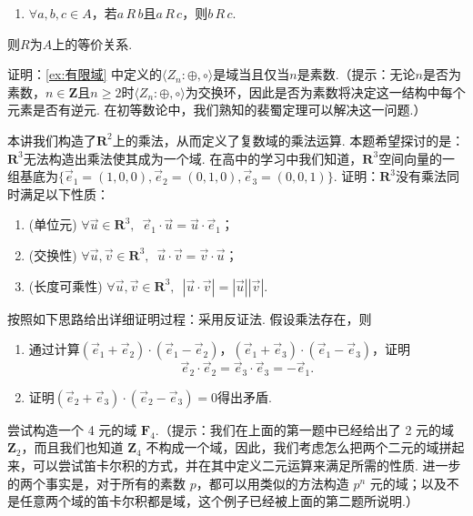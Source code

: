 \begin{exercise}
\begin{exgroup}
\begin{enumerate}
            \item $\forall a,b,c\in A$，若$a\,R\,b$且$a\,R\,c$，则$b\,R\,c$.
        \end{enumerate}
        则$R$为$A$上的等价关系.
    \end{exgroup}

    \begin{exgroup}
        \item 证明：\autoref{ex:有限域} 中定义的$\langle Z_n:\oplus,\circ\rangle$是域当且仅当$n$是素数.（提示：无论$n$是否为素数，$n\in\mathbf{Z}$且$n\geqslant 2$时$\langle Z_n:\oplus,\circ\rangle$为交换环，因此是否为素数将决定这一结构中每个元素是否有逆元. 在初等数论中，我们熟知的裴蜀定理可以解决这一问题.）

        \item 本讲我们构造了$\mathbf{R}^2$上的乘法，从而定义了复数域的乘法运算. 本题希望探讨的是：$\mathbf{R}^3$无法构造出乘法使其成为一个域. 在高中的学习中我们知道，$\mathbf{R}^3$空间向量的一组基底为$\{\vec{e}_1=(1,0,0),\vec{e}_2=(0,1,0),\vec{e}_3=(0,0,1)\}$. 证明：$\mathbf{R}^3$没有乘法同时满足以下性质：
        \begin{enumerate}
            \item (单位元) $\forall \vec{u}\in\mathbf{R}^3,\enspace\vec{e}_1\cdot \vec{u}=\vec{u}\cdot \vec{e}_1$；

            \item (交换性) $\forall \vec{u},\vec{v}\in\mathbf{R}^3,\enspace\vec{u}\cdot \vec{v}=\vec{v}\cdot \vec{u}$；

            \item (长度可乘性) $\forall \vec{u},\vec{v}\in\mathbf{R}^3,\enspace|\vec{u}\cdot\vec{v}|=|\vec{u}||\vec{v}|$.
        \end{enumerate}
        按照如下思路给出详细证明过程：采用反证法. 假设乘法存在，则
        \begin{enumerate}
            \item 通过计算$(\vec{e}_1+\vec{e}_2)\cdot(\vec{e}_1-\vec{e}_2)$，$(\vec{e}_1+\vec{e}_3)\cdot(\vec{e}_1-\vec{e}_3)$，证明\[\vec{e}_2\cdot\vec{e}_2=\vec{e}_3\cdot\vec{e}_3=-\vec{e}_1.\]

            \item 证明$(\vec{e}_2+\vec{e}_3)\cdot(\vec{e}_2-\vec{e}_3)=0$得出矛盾.
        \end{enumerate}

        \item 尝试构造一个 4 元的域 $\mathbf{F}_4$.（提示：我们在上面的第一题中已经给出了 2 元的域 $\mathbf{Z}_2$，而且我们也知道 $\mathbf{Z}_4$ 不构成一个域，因此，我们考虑怎么把两个二元的域拼起来，可以尝试笛卡尔积的方式，并在其中定义二元运算来满足所需的性质. 进一步的两个事实是，对于所有的素数 $p$，都可以用类似的方法构造 $p^n$ 元的域；以及不是任意两个域的笛卡尔积都是域，这个例子已经被上面的第二题所说明.）
    \end{exgroup}
\end{exercise}

